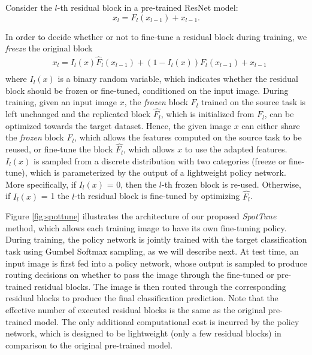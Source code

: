 \documentclass[10pt,twocolumn,letterpaper]{article}
\begin{document}
Consider the $l$-th residual block in a pre-trained ResNet model:
\begin{equation}
    x_l = F_l(x_{l-1}) + x_{l-1}.
\end{equation}

In order to decide whether or not to fine-tune a residual block during training, we \textit{freeze} the original block %
\begin{equation}
\begin{aligned}
    &x_l = I_{l}(x)\hat{F}_l(x_{l-1}) + (1-I_{l}(x))F_l(x_{l-1}) + x_{l-1}  \\
\end{aligned}
\end{equation}\noindent where $I_l(x)$ is a binary random variable, which indicates whether the residual block should be frozen or fine-tuned,  conditioned on the input image. During training, given an input image $x$, the \textit{frozen} block $F_l$ trained on the source task is left unchanged and the replicated block $\hat{F_l}$, which is initialized from $F_l$, can be optimized towards the target dataset. Hence, the given image $x$ can either share the \textit{frozen} block $F_l$, which allows the features computed on the source task to be reused, or fine-tune the block $\hat{F_l}$, which allows $x$ to use the adapted features. $I_l(x)$ is sampled from a discrete distribution with two categories (freeze or fine-tune), which is parameterized by the output of a lightweight policy network. More specifically, if $I_l(x)$ = 0, then the $l$-th frozen block is re-used. Otherwise, if $I_l(x)$ = 1 the $l$-th residual block is fine-tuned by optimizing $\hat{F_l}$.

Figure \ref{fig:spottune} illustrates the architecture of our proposed \textit{SpotTune} method, which allows each training image to have its own fine-tuning policy. During training, the policy network is jointly trained with the target classification task using Gumbel Softmax sampling, as we will describe next. At test time, an input image is first fed into a policy network, whose output is sampled to produce routing decisions on whether to pass the image through the fine-tuned or pre-trained residual blocks. The image is then routed through the corresponding residual blocks to produce the final classification prediction. Note that the effective number of executed residual blocks is the same as the original pre-trained model. The only additional computational cost is incurred by the policy network, which is designed to be lightweight (only a few residual blocks) in comparison to the original pre-trained model.
\end{document}
